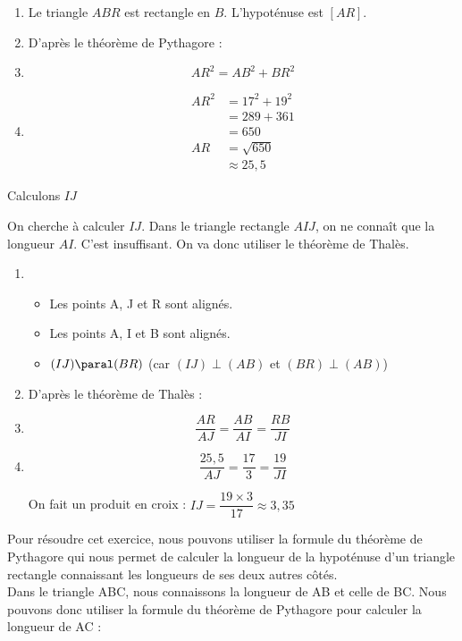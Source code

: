 \documentclass[../Cours.tex]{subfiles}
\begin{document}
\begin{questions}
\begin{enumerate}
    \item Le triangle $ABR$ est rectangle en $B$. L'hypoténuse est $[AR]$.
    \item D'après le théorème de Pythagore :
    \item $$AR^2 = AB^2+BR^2$$
    \item \begin{align*}
        AR^2 &= 17^2 + 19^2 \\
        &= 289 + 361 \\
        &= 650\\
        AR &= \sqrt{650} \\
        &\approx 25,5 
    \end{align*}
\end{enumerate}

\question Calculons $IJ$

On cherche à calculer $IJ$. Dans le triangle rectangle $AIJ$, on ne connaît que la longueur $AI$. C'est insuffisant. On va donc utiliser le théorème de Thalès.

\begin{enumerate}
    \item 
    \begin{itemize}
        \item Les points A, J et R sont alignés.
        \item Les points A, I et B sont alignés.
        \item $(IJ) \paral (BR)$ (car $(IJ) \perp (AB)$ et $(BR) \perp (AB)$)
    \end{itemize}
    \item D'après le théorème de Thalès :
    \item $$\dfrac{AR}{AJ} = \dfrac{AB}{AI} = \dfrac{RB}{JI}$$
    \item $$\dfrac{25,5}{AJ} = \dfrac{17}{3} = \dfrac{19}{JI}$$

    On fait un produit en croix : $IJ = \dfrac{19 \times 3}{17} \approx 3,35$
\end{enumerate}

\EXERCICE{}

Pour résoudre cet exercice, nous pouvons utiliser la formule du théorème de Pythagore qui nous permet de calculer la longueur de la hypoténuse d'un triangle rectangle connaissant les longueurs de ses deux autres côtés.\\

Dans le triangle ABC, nous connaissons la longueur de AB et celle de BC. Nous pouvons donc utiliser la formule du théorème de Pythagore pour calculer la longueur de AC :


\end{questions}
\end{document}
